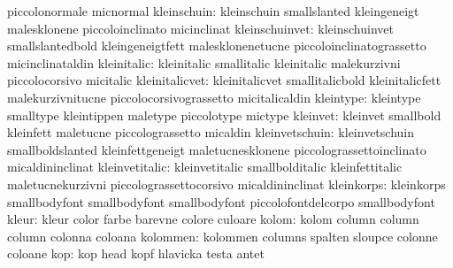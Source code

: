                            piccolonormale            micnormal
              kleinschuin: kleinschuin               smallslanted
                           kleingeneigt              malesklonene
                           piccoloinclinato          micinclinat
           kleinschuinvet: kleinschuinvet            smallslantedbold
                           kleingeneigtfett          malesklonenetucne
                           piccoloinclinatograssetto micinclinataldin
              kleinitalic: kleinitalic               smallitalic
                           kleinitalic               malekurzivni
                           piccolocorsivo            micitalic
           kleinitalicvet: kleinitalicvet            smallitalicbold
                           kleinitalicfett           malekurzivnitucne
                           piccolocorsivograssetto   micitalicaldin
                kleintype: kleintype                 smalltype
                           kleintippen               maletype
                           piccolotype               mictype
                 kleinvet: kleinvet                  smallbold
                           kleinfett                 maletucne
                           piccolograssetto          micaldin
           kleinvetschuin: kleinvetschuin            smallboldslanted
                           kleinfettgeneigt          maletucnesklonene
                           piccolograssettoinclinato micaldininclinat
           kleinvetitalic: kleinvetitalic            smallbolditalic
                           kleinfettitalic           maletucnekurzivni
                           piccolograssettocorsivo   micaldininclinat
               kleinkorps: kleinkorps                smallbodyfont
                           smallbodyfont             smallbodyfont
                           piccolofontdelcorpo       smallbodyfont %
                    kleur: kleur                     color
                           farbe                     barevne
                           colore                    culoare
                    kolom: kolom                     column
                           column                    column
                           colonna                   coloana %
                 kolommen: kolommen                  columns
                           spalten                   sloupce
                           colonne                   coloane
                      kop: kop                       head
                           kopf                      hlavicka
                           testa                     antet %
